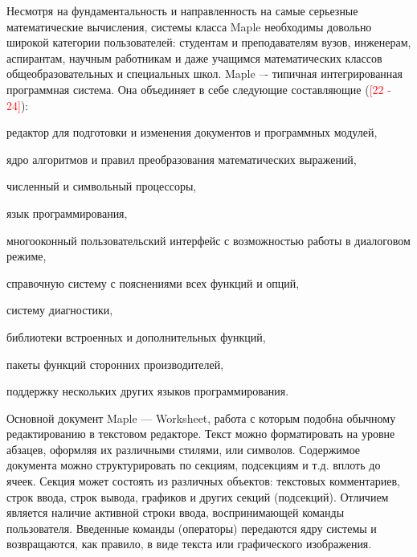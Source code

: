 Несмотря на фундаментальность и направленность на самые серьезные математические вычисления, системы класса Maple необходимы довольно широкой категории пользователей: студентам и преподавателям вузов, инженерам, аспирантам, научным работникам и даже учащимся математических классов общеобразовательных и специальных школ.
Maple –- типичная интегрированная программная система. Она объединяет в себе следующие составляющие (\textcolor{red}{[22 - 24]}):
\begin{textitemize}
	\item редактор для подготовки и изменения документов и программных модулей, 
	\item ядро алгоритмов и правил преобразования математических выражений, 
	\item численный и символьный процессоры, 
	\item язык программирования, 
	\item многооконный пользовательский интерфейс с возможностью работы в диалоговом режиме, 
	\item справочную систему с пояснениями всех функций и опций, 
	\item систему диагностики, 
	\item библиотеки встроенных и дополнительных функций, 
	\item пакеты функций сторонних производителей, 
	\item поддержку нескольких других языков программирования.
\end{textitemize}

Основной документ Maple --- Worksheet, работа с которым подобна обычному редактированию в текстовом редакторе. Текст можно форматировать на уровне абзацев, оформляя их различными стилями, или символов. Содержимое документа можно структурировать по секциям, подсекциям и т.д. вплоть до ячеек. Секция может состоять из различных объектов: текстовых комментариев, строк ввода, строк вывода, графиков и других секций (подсекций). Отличием является наличие активной строки ввода, воспринимающей команды пользователя. Введенные команды (операторы) передаются ядру системы и возвращаются, как правило, в виде текста или графического изображения. 

